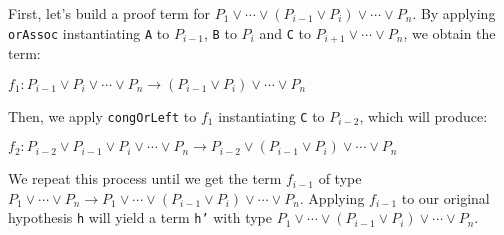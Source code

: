 
First, let's build a proof term for $P_{1} \vee \cdots \vee (P_{i - 1} \vee P_{i}) \vee \cdots \vee P_{n}$. By applying \texttt{orAssoc} instantiating \texttt{A} to $P_{i - 1}$, \texttt{B} to $P_{i}$ and \texttt{C} to $P_{i + 1} \vee \cdots \vee
P_{n}$, we obtain the term:

\begin{center}
    $f_{1}: P_{i - 1} \vee P_{i} \vee \cdots \vee P_{n}   \rightarrow (P_{i - 1} \vee P_{i}) \vee \cdots \vee P_{n} $
\end{center}

Then, we apply \texttt{congOrLeft} to $f_{1}$ instantiating \texttt{C} to $P_{i - 2}$, which will produce:

\begin{center}
    $f_{2}: P_{i - 2} \vee P_{i - 1} \vee P_{i} \vee \cdots \vee P_{n}   \rightarrow P_{i - 2} \vee (P_{i - 1} \vee P_{i}) \vee \cdots \vee P_{n} $
\end{center}

We repeat this process until we get the term $f_{i - 1}$ of type $P_{1} \vee \cdots \vee P_{n} \rightarrow P_{1} \vee \cdots \vee (P_{i - 1} \vee P_{i}) \vee \cdots \vee P_{n}$. Applying $f_{i - 1}$ to our original hypothesis \texttt{h} will yield a term \texttt{h'} with type $P_{1} \vee \cdots \vee (P_{i - 1} \vee P_{i}) \vee \cdots \vee P_{n}$.

